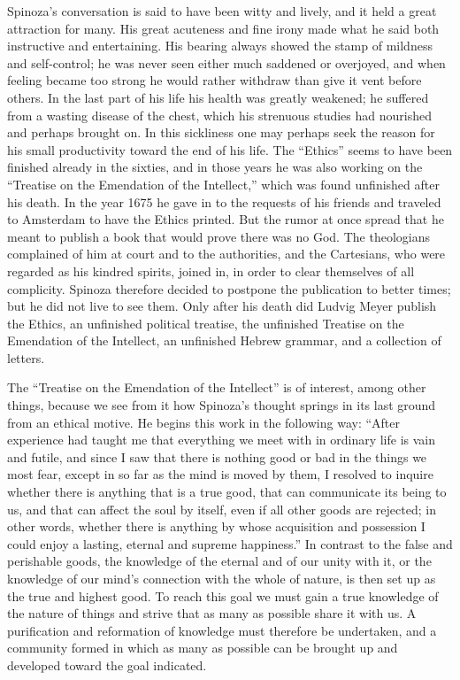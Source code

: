 \documentclass[12pt]{book}
\newcommand{\opage}[1]{\marginnote{\footnotesize\textit{[#1]}}}
\begin{document}
Spinoza's conversation is said to have been witty and lively, and it held a great
attraction for many. His great acuteness and fine irony made what he said both
instructive and entertaining. His bearing always showed the stamp of mildness and
self-control; he was never seen either much saddened or overjoyed, and when feeling
became too strong he would rather withdraw than give it vent before others. In the
last part of his life his health was greatly weakened; he suffered from a wasting
disease of the chest, which his strenuous studies had nourished and perhaps brought
on. In this sickliness one may perhaps seek the reason for his small productivity
toward the end of his life. The ``Ethics'' seems to have been finished already in the
sixties, and in those years he was also working on the ``Treatise on the Emendation of
the Intellect,'' which was found unfinished after his death. In the year 1675 he gave
in to the requests of his friends and traveled to Amsterdam to have the Ethics printed.
But the rumor at once spread that he meant to publish a book that would prove there
was no God. The theologians complained of him at court and to the authorities, and the
Cartesians, who were regarded as his kindred spirits, joined in, in order to clear
themselves of all complicity. Spinoza therefore decided to postpone the publication to
better times; but he did not live to see them. Only after \opage{38}his death did
Ludvig Meyer publish the Ethics, an unfinished political treatise, the unfinished
Treatise on the Emendation of the Intellect, an unfinished Hebrew grammar, and a
collection of letters.

The ``Treatise on the Emendation of the Intellect'' is of interest, among other
things, because we see from it how Spinoza's thought springs in its last ground from
an ethical motive. He begins this work in the following way: ``After experience had
taught me that everything we meet with in ordinary life is vain and futile, and since
I saw that there is nothing good or bad in the things we most fear, except in so far
as the mind is moved by them, I resolved to inquire whether there is anything that is
a true good, that can communicate its being to us, and that can affect the soul by
itself, even if all other goods are rejected; in other words, whether there is
anything by whose acquisition and possession I could enjoy a lasting, eternal and
supreme happiness.'' In contrast to the false and perishable goods, the knowledge of
the eternal and of our unity with it, or the knowledge of our mind's connection with
the whole of nature, is then set up as the true and highest good. To reach this goal
we must gain a true knowledge of the nature of things and strive that as many as
possible share it with us. A purification and reformation of knowledge must therefore
be undertaken, and a community formed in which as many as possible can be brought up
and developed toward the goal indicated.
\end{document}
